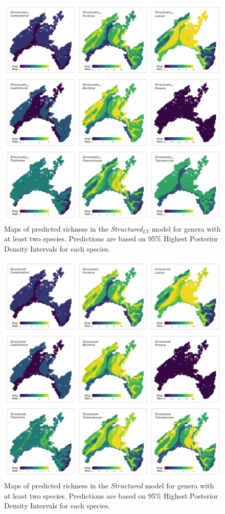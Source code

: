 \documentclass[preprint,review,times,12pt]{elsarticle}
\begin{document}
\begin{figure}
	\centering\includegraphics[width=6in]{ms/1_Ecography/1/figs/maps/gen_S_S+LV.png}
	\caption{\label{fig:gen_map_Structured_LV} Maps of predicted richness in the \emph{Structured}$_{LV}$ model for genera with at least two species. Predictions are based on 95\% Highest Posterior Density Intervals for each species. }
\end{figure}

\begin{figure}
	\centering\includegraphics[width=6in]{ms/1_Ecography/1/figs/maps/gen_S_S.png}
	\caption{\label{fig:gen_map_Structured} Maps of predicted richness in the \emph{Structured} model for genera with at least two species. Predictions are based on 95\% Highest Posterior Density Intervals for each species. }
\end{figure}
\end{document}
